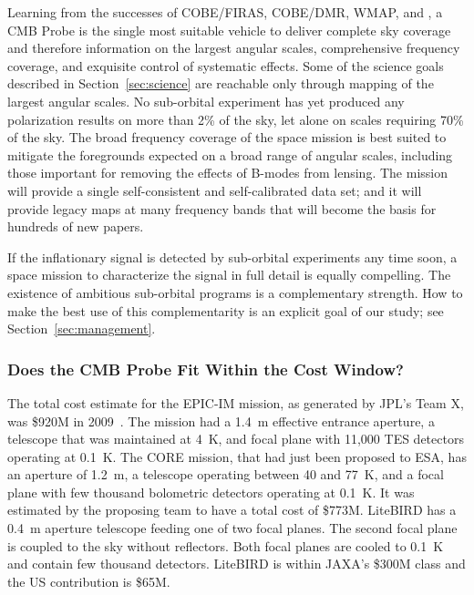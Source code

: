 Learning from the successes of COBE/FIRAS, COBE/DMR, WMAP, and \planck, a
CMB Probe is the single most suitable vehicle to deliver complete sky coverage 
and therefore information on the largest angular scales, 
comprehensive frequency coverage, and exquisite control of systematic effects. 
Some of the science goals described in Section~\ref{sec:science} 
are reachable only through mapping of the largest angular scales. No sub-orbital experiment 
has yet produced any polarization results on more than 2\% of the sky, let alone 
on scales requiring 70\% of the sky. The broad frequency coverage of the space 
mission is best suited to mitigate the foregrounds expected on a broad range of angular 
scales, including those important for removing the effects of B-modes from lensing. 
The mission will provide a single self-consistent and self-calibrated data set;  and it  
will provide legacy maps at many frequency bands that will become the basis for 
hundreds of new papers. 

If the inflationary signal is detected by sub-orbital experiments
any time soon, a space mission to characterize the signal in full detail is equally compelling. 
The existence of ambitious sub-orbital programs is a complementary strength. How 
to make the best use of this complementarity is an explicit goal of our study; 
see Section~\ref{sec:management}.

\vspace{-0.18in}

\subsubsection{Does the CMB Probe Fit Within the Cost Window?} 

\vspace{-0.05in}

The total cost estimate for the EPIC-IM mission, as generated by JPL's Team X, was \$920M in 2009~\cite{bock2009}. 
The mission had a 1.4~m effective entrance aperture, a telescope that was maintained
at 4~K, and focal plane with 11,000 TES detectors operating at 0.1~K.  The CORE mission, that had just been 
proposed to ESA, has an aperture of 1.2~m, a telescope operating 
between 40 and 77~K, and a focal plane with few thousand bolometric detectors operating at 0.1~K. 
It was estimated by the proposing team to have a total cost of \$773M.  
LiteBIRD has a 0.4~m aperture telescope feeding one of two focal planes. The second 
focal plane is coupled to the sky without reflectors. Both focal planes are cooled to 
0.1~K and contain few thousand detectors. LiteBIRD is within JAXA's \$300M class and the 
US contribution is \$65M.  


